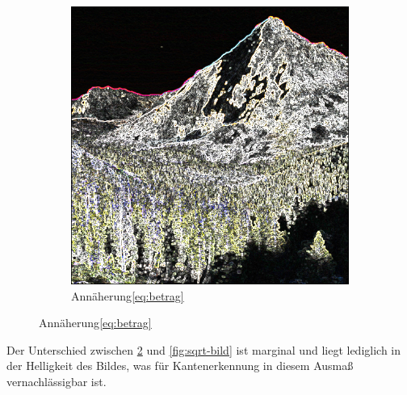 \documentclass[course=erap]{aspdoc}
\begin{document}
\begin{figure}[H]
\begin{subfigure}{.5\columnwidth}
        \includegraphics[width=\columnwidth]{graphics/johnmuirtrail_sobel}
        \caption{Annäherung\ref{eq:betrag}}
        \label{fig:abs-bild}
    \end{subfigure}
\end{figure}
Der Unterschied zwischen \ref{fig:abs-bild} und \ref{fig:sqrt-bild} ist marginal und liegt lediglich in der Helligkeit des Bildes, was für Kantenerkennung in diesem Ausmaß vernachlässigbar ist.
\end{document}
